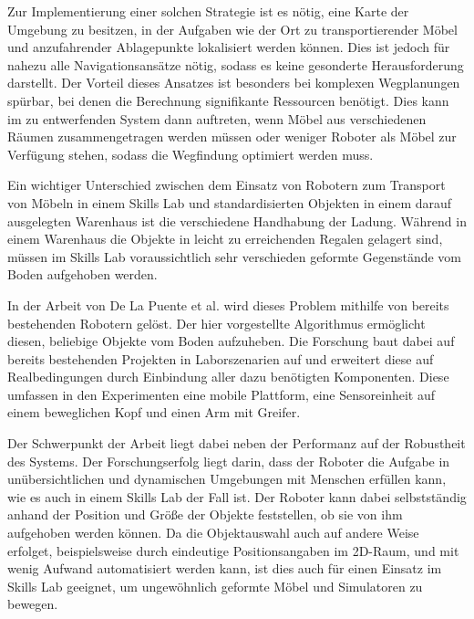 Zur Implementierung einer solchen Strategie ist es nötig, eine Karte der Umgebung zu besitzen, in der Aufgaben wie der Ort zu transportierender Möbel und anzufahrender Ablagepunkte lokalisiert werden können. Dies ist jedoch für nahezu alle Navigationsansätze nötig, sodass es keine gesonderte Herausforderung darstellt. Der Vorteil dieses Ansatzes ist besonders bei komplexen Wegplanungen spürbar, bei denen die Berechnung signifikante Ressourcen benötigt. Dies kann im zu entwerfenden System dann auftreten, wenn Möbel aus verschiedenen Räumen zusammengetragen werden müssen oder weniger Roboter als Möbel zur Verfügung stehen, sodass die Wegfindung optimiert werden muss.

Ein wichtiger Unterschied zwischen dem Einsatz von Robotern zum Transport von Möbeln in einem Skills Lab und standardisierten Objekten in einem darauf ausgelegten Warenhaus ist die verschiedene Handhabung der Ladung. Während in einem Warenhaus die Objekte in leicht zu erreichenden Regalen gelagert sind, müssen im Skills Lab voraussichtlich sehr verschieden geformte Gegenstände vom Boden aufgehoben werden.

In der Arbeit von De La Puente et al. \cite{assistRobot} wird dieses Problem mithilfe von bereits bestehenden Robotern gelöst. Der hier vorgestellte Algorithmus ermöglicht diesen, beliebige Objekte vom Boden aufzuheben. Die Forschung baut dabei auf bereits bestehenden Projekten in Laborszenarien auf und erweitert diese auf Realbedingungen durch Einbindung aller dazu benötigten Komponenten. Diese umfassen in den Experimenten eine mobile Plattform, eine Sensoreinheit auf einem beweglichen Kopf und einen Arm mit Greifer.

Der Schwerpunkt der Arbeit liegt dabei neben der Performanz auf der Robustheit des Systems. Der Forschungserfolg liegt darin, dass der Roboter die Aufgabe in unübersichtlichen und dynamischen Umgebungen mit Menschen erfüllen kann, wie es auch in einem Skills Lab der Fall ist. Der Roboter kann dabei selbstständig anhand der Position und Größe  der Objekte feststellen, ob sie von ihm aufgehoben werden können. Da die Objektauswahl auch auf andere Weise erfolget, beispielsweise durch eindeutige Positionsangaben im 2D-Raum, und mit wenig Aufwand automatisiert werden kann, ist dies auch für einen Einsatz im Skills Lab geeignet, um ungewöhnlich geformte Möbel und Simulatoren zu bewegen.

